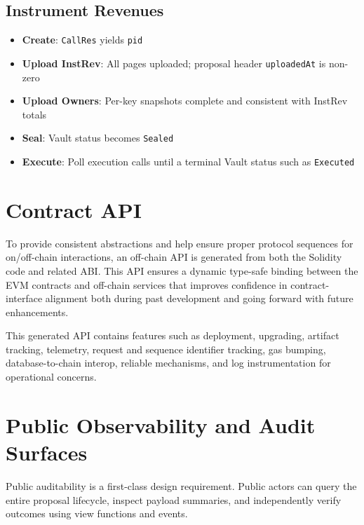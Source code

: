 \documentclass[10pt]{article}
\begin{document}
\subsection{Instrument Revenues}
\begin{itemize}
    \item \textbf{Create}: \texttt{CallRes} yields \texttt{pid}
    \item \textbf{Upload InstRev}: All pages uploaded; proposal header \texttt{uploadedAt} is non-zero
    \item \textbf{Upload Owners}: Per-key snapshots complete and consistent with InstRev totals
    \item \textbf{Seal}: Vault status becomes \texttt{Sealed}
    \item \textbf{Execute}: Poll execution calls until a terminal Vault status such as \texttt{Executed}
\end{itemize}

\section{Contract API}
To provide consistent abstractions and help ensure proper protocol sequences for on/off-chain interactions, an off-chain API is generated from both the Solidity code and related ABI.  This API ensures a dynamic type-safe binding between the EVM contracts and off-chain services that improves confidence in contract-interface alignment both during past development and going forward with future enhancements.

This generated API contains features such as deployment, upgrading, artifact tracking, telemetry, request and sequence identifier tracking, gas bumping, database-to-chain interop, reliable mechanisms, and log instrumentation for operational concerns.

\clearpage
\section{Public Observability and Audit Surfaces}
Public auditability is a first-class design requirement. Public actors can query the entire proposal lifecycle,
inspect payload summaries, and independently verify outcomes using view functions and events.
\end{document}
